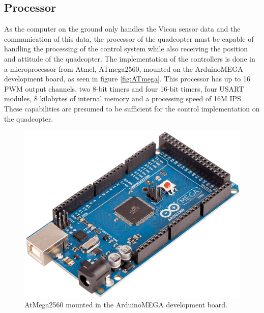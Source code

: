 \subsection{Processor}
As the computer on the ground only handles the Vicon sensor data and the communication of this data, the processor of the quadcopter must be capable of handling the processing of the control system while also receiving the position and attitude of the quadcopter.
The implementation of the controllers is done in a microprocessor from Atmel, ATmega2560, mounted on the ArduinoMEGA development board, as seen in figure \autoref{fig:ATmega}. This processor has up to 16 PWM output channels, two 8-bit timers and four 16-bit timers, four USART modules, 8 kilobytes of internal memory and a processing speed of 16M IPS. These capabilities are presumed to be sufficient for the control implementation on the quadcopter.

\begin{figure}[H]
	\centering
	\includegraphics[scale=0.12]{figures/ARDUINO_MEGA}
	\caption{AtMega2560 mounted in the ArduinoMEGA development board.\cite{ArduinoMegaImage}}
	\label{fig:ATmega}
\end{figure}
%
